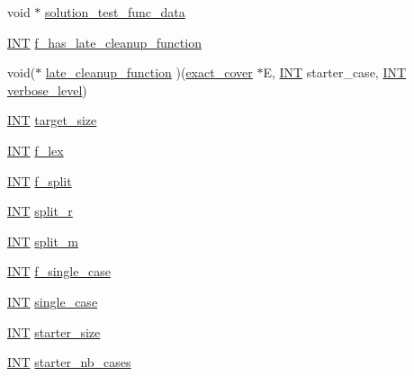 \begin{DoxyCompactItemize}
\item 
void $\ast$ \mbox{\hyperlink{classexact__cover_ad838afae5db456921a2f4f15c7c4b76d}{solution\+\_\+test\+\_\+func\+\_\+data}}
\item 
\mbox{\hyperlink{galois_8h_a09fddde158a3a20bd2dcadb609de11dc}{I\+NT}} \mbox{\hyperlink{classexact__cover_a59e3c500246e19489687aa496ee7c59e}{f\+\_\+has\+\_\+late\+\_\+cleanup\+\_\+function}}
\item 
void($\ast$ \mbox{\hyperlink{classexact__cover_a2de0d7595958b0daae7cee54d3ae1904}{late\+\_\+cleanup\+\_\+function}} )(\mbox{\hyperlink{classexact__cover}{exact\+\_\+cover}} $\ast$E, \mbox{\hyperlink{galois_8h_a09fddde158a3a20bd2dcadb609de11dc}{I\+NT}} starter\+\_\+case, \mbox{\hyperlink{galois_8h_a09fddde158a3a20bd2dcadb609de11dc}{I\+NT}} \mbox{\hyperlink{simeon_8_c_a818073fbcc2f439e7c56952f67386122}{verbose\+\_\+level}})
\item 
\mbox{\hyperlink{galois_8h_a09fddde158a3a20bd2dcadb609de11dc}{I\+NT}} \mbox{\hyperlink{classexact__cover_a368eff6db9702763a0931b959301e091}{target\+\_\+size}}
\item 
\mbox{\hyperlink{galois_8h_a09fddde158a3a20bd2dcadb609de11dc}{I\+NT}} \mbox{\hyperlink{classexact__cover_a8090185b57af9c673cf7158d38e18226}{f\+\_\+lex}}
\item 
\mbox{\hyperlink{galois_8h_a09fddde158a3a20bd2dcadb609de11dc}{I\+NT}} \mbox{\hyperlink{classexact__cover_a0f1968a828c21b70da15532dede76345}{f\+\_\+split}}
\item 
\mbox{\hyperlink{galois_8h_a09fddde158a3a20bd2dcadb609de11dc}{I\+NT}} \mbox{\hyperlink{classexact__cover_a9834de86e686f17a446379723f213c1b}{split\+\_\+r}}
\item 
\mbox{\hyperlink{galois_8h_a09fddde158a3a20bd2dcadb609de11dc}{I\+NT}} \mbox{\hyperlink{classexact__cover_a85c514d59270f8fba83a846b884baaf9}{split\+\_\+m}}
\item 
\mbox{\hyperlink{galois_8h_a09fddde158a3a20bd2dcadb609de11dc}{I\+NT}} \mbox{\hyperlink{classexact__cover_af782b1875be56ef5a979ee7b38bc0393}{f\+\_\+single\+\_\+case}}
\item 
\mbox{\hyperlink{galois_8h_a09fddde158a3a20bd2dcadb609de11dc}{I\+NT}} \mbox{\hyperlink{classexact__cover_a8392ddf9f4b8cb1ee6dd3f8b5b143856}{single\+\_\+case}}
\item 
\mbox{\hyperlink{galois_8h_a09fddde158a3a20bd2dcadb609de11dc}{I\+NT}} \mbox{\hyperlink{classexact__cover_a2930a79e660bf9afa39c36e5715b00f4}{starter\+\_\+size}}
\item 
\mbox{\hyperlink{galois_8h_a09fddde158a3a20bd2dcadb609de11dc}{I\+NT}} \mbox{\hyperlink{classexact__cover_ab683db45a584b6d20fde47afea5e6566}{starter\+\_\+nb\+\_\+cases}}

\end{DoxyCompactItemize}
